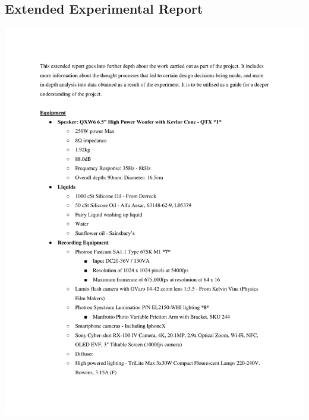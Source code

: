 \documentclass[12pt, journal, transmag, onecolumn]{IEEEtran}
\begin{document}
\begin{appendices}



\clearpage



\clearpage




\clearpage




\clearpage




\clearpage




\clearpage



\clearpage


\clearpage
\section{Extended Experimental Report}
\includegraphics[width=\textwidth]{CollatedReport.pdf}

\end{appendices}
\end{document}
